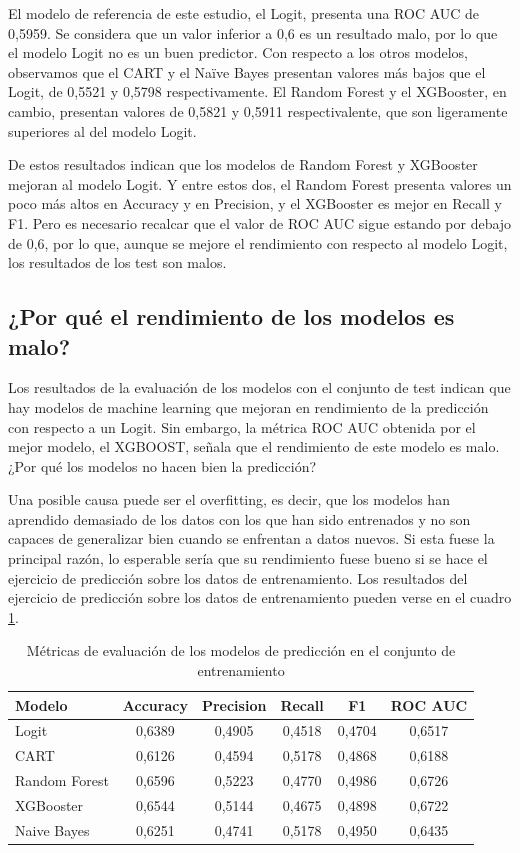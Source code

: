 El modelo de referencia de este estudio, el Logit, presenta una ROC AUC de 0,5959. Se considera que un valor inferior a 0,6 es un resultado malo, por lo que el modelo Logit no es un buen predictor. Con respecto a los otros modelos, observamos que el CART y el Naïve Bayes presentan valores más bajos que el Logit, de 0,5521 y 0,5798 respectivamente. El Random Forest y el XGBooster, en cambio, presentan valores de 0,5821 y 0,5911 respectivalente, que son ligeramente superiores al del modelo Logit.

De estos resultados indican que los modelos de Random Forest y XGBooster mejoran al modelo Logit. Y entre estos dos, el Random Forest presenta valores un poco más altos en Accuracy y en Precision, y el XGBooster es mejor en Recall y F1. Pero es necesario recalcar que el valor de ROC AUC sigue estando por debajo de 0,6, por lo que, aunque se mejore el rendimiento con respecto al modelo Logit, los resultados de los test son malos.

\subsection*{¿Por qué el rendimiento de los modelos es malo?}

Los resultados de la evaluación de los modelos con el conjunto de test indican que hay modelos de machine learning que mejoran en rendimiento de la predicción con respecto a un Logit. Sin embargo, la métrica ROC AUC obtenida por el mejor modelo, el XGBOOST, señala que el rendimiento de este modelo es malo. ¿Por qué los modelos no hacen bien la predicción?

Una posible causa puede ser el overfitting, es decir, que los modelos han aprendido demasiado de los datos con los que han sido entrenados y no son capaces de generalizar bien cuando se enfrentan a datos nuevos. Si esta fuese la principal razón, lo esperable sería que su rendimiento fuese bueno si se hace el ejercicio de predicción sobre los datos de entrenamiento. Los resultados del ejercicio de predicción sobre los datos de entrenamiento pueden verse en el cuadro \ref{table:train}.

\begin{table}[ht]
    \centering
    \begin{tabular}{lccccc}
    \hline
        \textbf{Modelo} & \textbf{Accuracy} & \textbf{Precision} & \textbf{Recall} & \textbf{F1} & \textbf{ROC AUC} \\ \hline
        Logit & 0,6389 & 0,4905 & 0,4518 & 0,4704 & 0,6517 \\ 
        CART & 0,6126 & 0,4594 & 0,5178 & 0,4868 & 0,6188 \\ 
        Random Forest & 0,6596 & 0,5223 & 0,4770 & 0,4986 & 0,6726 \\ 
        XGBooster & 0,6544 & 0,5144 & 0,4675 & 0,4898 & 0,6722 \\ 
        Naive Bayes & 0,6251 & 0,4741 & 0,5178 & 0,4950 & 0,6435 \\ \hline
    \end{tabular}
    \caption{Métricas de evaluación de los modelos de predicción en el conjunto de entrenamiento}
    \label{table:train}
\end{table}

